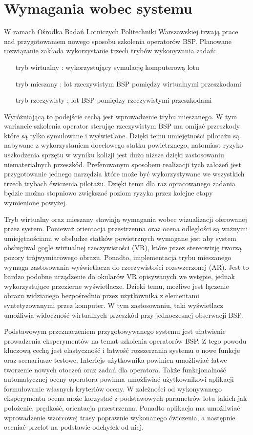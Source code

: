 \newpage
\section{Wymagania wobec systemu}
W ramach Ośrodka Badań Lotniczych Politechniki Warszawskiej trwają prace nad przygotowaniem nowego sposobu szkolenia operatorów BSP. Planowane rozwiązanie zakłada wykorzystanie trzech trybów wykonywania zadań:
\begin{enumerate}
  \item[tryb wirtualny]: wykorzystujący symulację komputerową lotu
  \item[tryb mieszany]: lot rzeczywistym BSP pomiędzy wirtualnymi przeszkodami
  \item[tryb rzeczywisty]; lot BSP pomiędzy rzeczywistymi przeszkodami
\end{enumerate}
Wyróżniającą to podejście cechą jest wprowadzenie trybu mieszanego. W tym wariancie szkolenia operator sterując rzeczywistym BSP ma omijać przeszkody które są tylko symulowane i wyświetlane. Dzięki temu umiejętności pilotażu są nabywane z wykorzystaniem docelowego statku powietrznego, natomiast ryzyko uszkodzenia sprzętu w wyniku kolizji jest dużo niższe dzięki zastosowaniu niematerialnych przeszkód. Preferowanym sposobem realizacji tych założeń jest przygotowanie jednego narzędzia które może być wykorzystywane we wszystkich trzech trybach ćwiczenia pilotażu. Dzięki temu dla raz opracowanego zadania będzie można stopniowo zwiększać poziom ryzyka przez kolejne etapy wymienione powyżej.

Tryb wirtualny oraz mieszany stawiają wymagania wobec wizualizacji oferowanej przez system. Ponieważ orientacja przestrzenna oraz ocena odległości są ważnymi umiejętnościami w obsłudze statków powietrznych wymagane jest aby system obsługiwał gogle wirtualnej rzeczywistości (VR), które przez stereowizję tworzą pozory trójwymiarowego obrazu. Ponadto, implementacja trybu mieszanego wymaga zastosowania wyświetlacza do rzeczywistości rozswzerzonej (AR). Jest to bardzo podobne urządzenie do okularów VR opisywanych we wstępie, jednak wykorzystujące przezierne wyświetlacze. Dzięki temu, możliwe jest łączenie obrazu widzianego bezpośrednio przez użytkownika z elementami syntetyzowanymi przez komputer. W tym zastosowaniu, taki wyświetlacz umożliwia widoczność wirtualnych przeszkód przy jednoczesnej obserwacji BSP.

Podstawowym przeznaczeniem przygotowywanego systemu jest ułatwienie prowadzenia eksperymentów na temat szkolenia operatorów BSP. Z tego powodu kluczową cechą jest elastyczność i łatwość rozszerzania systemu o nowe funkcje oraz scenariusze testowe. Interfejs użytkownika powinien umożliwiać łatwe tworzenie nowych otoczeń oraz zadań dla operatora. Także funkcjonalność automatycznej oceny operatora powinna umożliwiać użytkownikowi aplikacji formułowanie własnych kryteriów oceny. W zależności od wykonywanego eksperymentu ocena może korzystać z podstawowych parametrów lotu takich jak położenie, prędkość, orientacja przestrzenna. Ponadto aplikacja ma umożliwiać wprowadzenie wzorcowej trasy poprawnie wykonanego ćwiczenia, a następnie oceniać przelot na podstawie odchyłek od niej.


